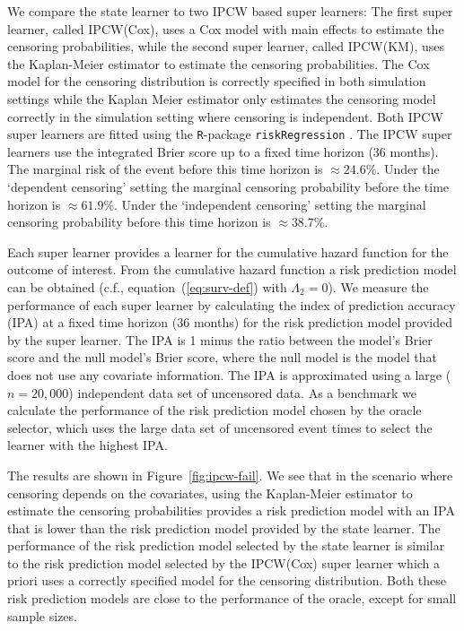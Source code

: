 \documentclass[a4paper,danish]{article}
\theoremstyle{plain} %
\numberwithin{theorem}{section}
\theoremstyle{definition} %
\theoremstyle{remark}
\newcommand{\1}{\mathds{1}}
\begin{document}
We compare the state learner to two IPCW based super learners: The
first super learner, called IPCW(Cox), uses a Cox model with main
effects to estimate the censoring probabilities, while the second
super learner, called IPCW(KM), uses the Kaplan-Meier estimator to
estimate the censoring probabilities. The Cox model for the censoring
distribution is correctly specified in both simulation settings while
the Kaplan Meier estimator only estimates the censoring model
correctly in the simulation setting where censoring is
independent. Both IPCW super learners are fitted using the
\texttt{R}-package \texttt{riskRegression}
\citep{Gerds_Ohlendorff_Ozenne_2023}.
%
%
The IPCW super learners use the integrated Brier score up to a fixed time
horizon (36 months). The marginal risk of the event before this time horizon is
\(\approx 24.6\)\%. Under the `dependent censoring' setting the marginal
censoring probability before the time horizon is \(\approx 61.9\)\%. Under the
`independent censoring' setting the marginal censoring probability before this
time horizon is \( \approx 38.7 \)\%.

Each super learner provides a learner for the cumulative hazard
function for the outcome of interest. From the cumulative hazard
function a risk prediction model can be obtained (c.f.,
equation~(\ref{eq:surv-def}) with $\Lambda_2 = 0$). We measure the
performance of each super learner by calculating the index of
prediction accuracy (IPA) \citep{kattan2018index} at a fixed time
horizon (36 months) for the risk prediction model provided by the
super learner. The IPA is 1 minus the ratio between the model's Brier
score and the null model's Brier score, where the null model is the
model that does not use any covariate information. The IPA is
approximated using a large (\( n = 20,000 \)) independent data set of
uncensored data. As a benchmark we calculate the performance of the
risk prediction model chosen by the oracle selector, which uses the
large data set of uncensored event times to select the learner with
the highest IPA.

The results are shown in Figure~\ref{fig:ipcw-fail}. We see that in
the scenario where censoring depends on the covariates, using the
Kaplan-Meier estimator to estimate the censoring probabilities
provides a risk prediction model with an IPA that is lower than the
risk prediction model provided by the state learner. The performance
of the risk prediction model selected by the state learner is similar
to the risk prediction model selected by the IPCW(Cox) super learner
which a priori uses a correctly specified model for the censoring
distribution. Both these risk prediction models are close to the
performance of the oracle, except for small sample sizes.
\end{document}
